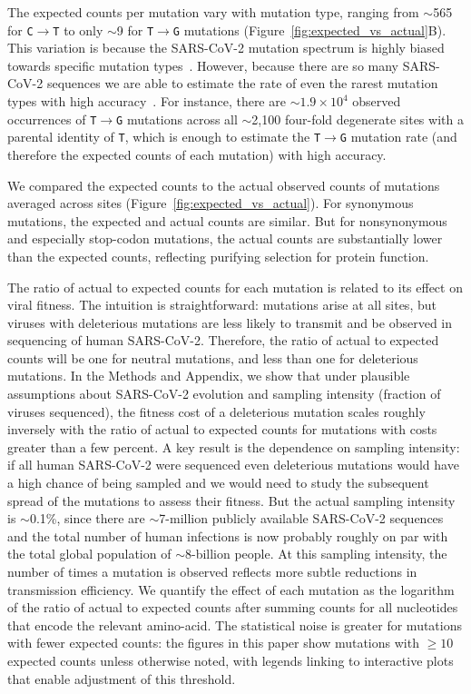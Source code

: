 \documentclass[9pt,twocolumn,twoside]{gsajnl_modified}
\begin{document}
The expected counts per mutation vary with mutation type, ranging from $\sim$565 for \texttt{C$\rightarrow$T} to only $\sim$9 for \texttt{T$\rightarrow$G} mutations (Figure~\ref{fig:expected_vs_actual}B).
This variation is because the SARS-CoV-2 mutation spectrum is highly biased towards specific mutation types~\citep{bloom2023evolution,ruis2022mutational,de2021mutation,neher2022contributions}.
However, because there are so many SARS-CoV-2 sequences we are able to estimate the rate of even the rarest mutation types with high accuracy~\cite{bloom2023evolution}.
For instance, there are $\sim 1.9\times 10^4$ observed occurrences of \texttt{T$\rightarrow$G} mutations across all $\sim$2,100 four-fold degenerate sites with a parental identity of \texttt{T}, which is enough to estimate the \texttt{T$\rightarrow$G} mutation rate (and therefore the expected counts of each mutation) with high accuracy.

We compared the expected counts to the actual observed counts of mutations averaged across sites (Figure~\ref{fig:expected_vs_actual}).
For synonymous mutations, the expected and actual counts are similar.
But for nonsynonymous and especially stop-codon mutations, the actual counts are substantially lower than the expected counts, reflecting purifying selection for protein function.

The ratio of actual to expected counts for each mutation is related to its effect on viral fitness.
The intuition is straightforward: mutations arise at all sites, but viruses with deleterious mutations are less likely to transmit and be observed in sequencing of human SARS-CoV-2.
Therefore, the ratio of actual to expected counts will be one for neutral mutations, and less than one for deleterious mutations.
In the Methods and Appendix, we show that under plausible assumptions about SARS-CoV-2 evolution and sampling intensity (fraction of viruses sequenced), the fitness cost of a deleterious mutation scales roughly inversely with the ratio of actual to expected counts for mutations with costs greater than a few percent.
A key result is the dependence on sampling intensity: if all human SARS-CoV-2 were sequenced even deleterious mutations would have a high chance of being sampled and we would need to study the subsequent spread of the mutations to assess their fitness.
But the actual sampling intensity is $\sim$0.1\%, since there are $\sim$7-million publicly available SARS-CoV-2 sequences and the total number of human infections is now probably roughly on par with the total global population of $\sim$8-billion people.
At this sampling intensity, the number of times a mutation is observed reflects more subtle reductions in transmission efficiency.
We quantify the effect of each mutation as the logarithm of the ratio of actual to expected counts after summing counts for all nucleotides that encode the relevant amino-acid.
The statistical noise is greater for mutations with fewer expected counts: the figures in this paper show mutations with $\ge10$ expected counts unless otherwise noted, with legends linking to interactive plots that enable adjustment of this threshold.
\end{document}
